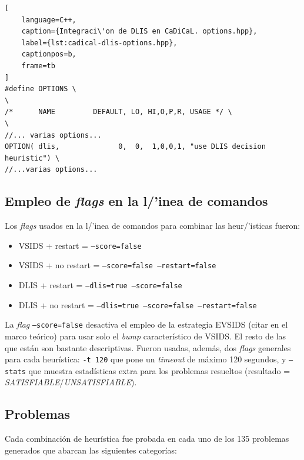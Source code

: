 \begin{lstlisting}[
    language=C++,
    caption={Integraci\'on de DLIS en CaDiCaL. options.hpp},
    label={lst:cadical-dlis-options.hpp},
    captionpos=b,
    frame=tb
]
#define OPTIONS \
\
/*      NAME         DEFAULT, LO, HI,O,P,R, USAGE */ \
\
//... varias options...
OPTION( dlis,              0,  0,  1,0,0,1, "use DLIS decision heuristic") \
//...varias options...

\end{lstlisting}

\subsection{Empleo de \textit{flags} en la l/'inea de comandos}
Los \textit{flags} usados en la l/'inea de comandos para combinar las heur/'isticas fueron:
\begin{itemize}
    \item VSIDS + restart = \texttt{--score=false}
    \item VSIDS + no restart = \texttt{--score=false --restart=false}
    \item DLIS + restart = \texttt{--dlis=true --score=false}
    \item DLIS + no restart = \texttt{--dlis=true --score=false --restart=false}
\end{itemize}

La \textit{flag} \texttt{--score=false} desactiva el empleo de la estrategia EVSIDS (citar en el marco te\'orico) para usar solo el \textit{bump} caracter\'istico de VSIDS. El resto de las que est\'an son bastante descriptivas. 
Fueron usadas, adem\'as, dos \textit{flags} generales para cada heur\'istica: \texttt{-t 120} que pone un \textit{timeout} de m\'aximo 120 segundos, y \texttt{--stats} que muestra estad\'isticas extra para los problemas resueltos (resultado = \textit{SATISFIABLE}/\textit{UNSATISFIABLE}).

\subsection{Problemas}
Cada combinaci\'on de heur\'istica fue probada en cada uno de los 135 problemas generados que abarcan las siguientes categor\'ias:

